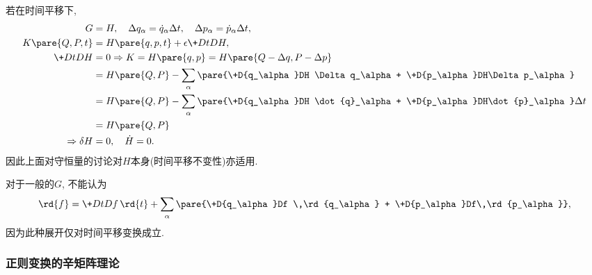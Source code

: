 \documentclass{ctexart}
\begin{document}
若在时间平移下,
\begin{align*}
    G &= H,\quad \Delta q_\alpha = \dot{q}_\alpha\Delta t,\quad \Delta p_\alpha = \dot{p}_\alpha \Delta t, \\
    K\pare{Q,P,t} &= H\pare{q,p,t} + \epsilon \+DtDH,\\
    \+DtDH &= 0 \Rightarrow K = H\pare{q,p} = H\pare{Q-\Delta q,P-\Delta p} \\
    &= H\pare{Q,P} - \sum_\alpha \pare{\+D{q_\alpha}DH \Delta q_\alpha + \+D{p_\alpha}DH\Delta p_\alpha} \\
    &= H\pare{Q,P} - \sum_\alpha \pare{\+D{q_\alpha}DH \dot{q}_\alpha + \+D{p_\alpha}DH\dot{p}_\alpha}\Delta t \\
    &= H\pare{Q,P} \\
    \Rightarrow \delta H &= 0,\quad \dot{H} = 0.
\end{align*}
因此上面对守恒量的讨论对$H$本身(时间平移不变性)亦适用.
\begin{remark}
    对于一般的$G$, 不能认为
    \[ \rd{f} = \+DtDf\,\rd{t} + \sum_\alpha\pare{\+D{q_\alpha}Df \,\rd{q_\alpha} + \+D{p_\alpha}Df\,\rd{p_\alpha}}, \]
    因为此种展开仅对时间平移变换成立.
\end{remark}


\subsubsection{正则变换的辛矩阵理论} %
\label{ssub:正则变换的辛矩阵理论}
\end{document}
